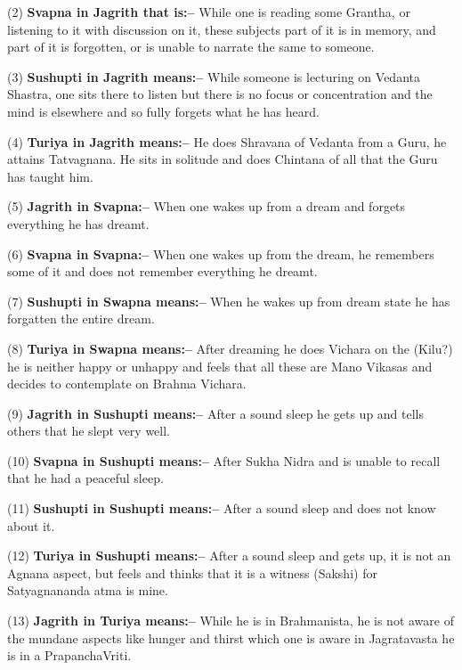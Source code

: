 \vskip 2pt

(2) \textbf{Svapna in Jagrith that is:–} While one is reading some Grantha, or listening to it with discussion on it, these subjects part of it is in memory, and part of it is forgotten, or is unable to narrate the same to someone.

\vskip 2pt

(3) \textbf{Sushupti in Jagrith means:–} While someone is lecturing on Vedanta Shastra, one sits there to listen but there is no focus or concentration and the mind is elsewhere and so fully forgets what he has heard.

\vskip 2pt

(4) \textbf{Turiya in Jagrith means:–} He does Shravana of Vedanta from a Guru, he attains Tatvagnana. He sits in solitude and does Chintana of all that the Guru has taught him.

\vskip 2pt

(5) \textbf{Jagrith in Svapna:–} When one wakes up from a dream and forgets everything he has dreamt.

\vskip 2pt

(6) \textbf{Svapna in Svapna:–} When one wakes up from the dream, he remembers some of it and does not remember everything he dreamt.

(7) \textbf{Sushupti in Swapna means:–} When he wakes up from dream state he has forgatten the entire dream.

(8) \textbf{Turiya in Swapna means:–} After dreaming he does Vichara on the (Kilu?) he is neither happy or unhappy and feels that all these are Mano Vikasas and decides to contemplate on Brahma Vichara.

(9) \textbf{Jagrith in Sushupti means:–} After a sound sleep he gets up and tells others that he slept very well.

(10) \textbf{Svapna in Sushupti means:–} After Sukha Nidra and is unable to recall that he had a peaceful sleep.

(11) \textbf{Sushupti in Sushupti means:–} After a sound sleep and does not know about it.

(12) \textbf{Turiya in Sushupti means:–} After a sound sleep and gets up, it is not an Agnana aspect, but feels and thinks that it is a witness (Sakshi) for Satyagnananda atma is mine.

(13) \textbf{Jagrith in Turiya means:–} While he is in Brahmanista, he is not aware of the mundane aspects like hunger and thirst which one is aware in Jagratavasta he is in a PrapanchaVriti.

